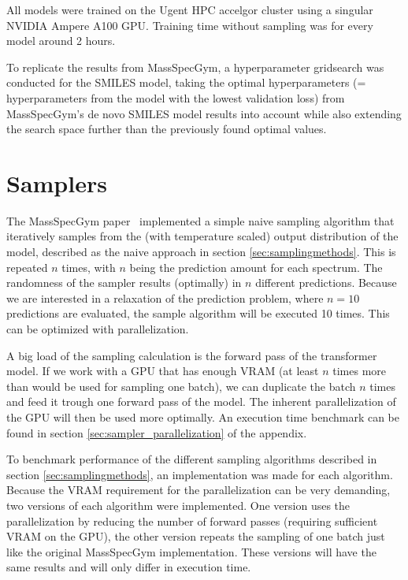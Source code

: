 All models were trained on the Ugent \ac{HPC} accelgor cluster using a singular NVIDIA Ampere A100 GPU.
Training time without sampling was for every model around 2 hours. 

To replicate the results from MassSpecGym, a hyperparameter gridsearch was conducted for the SMILES model, taking the optimal hyperparameters (= hyperparameters from the model with the lowest validation loss) from MassSpecGym's de novo SMILES model results into account
while also extending the search space further than the previously found optimal values.

\section{Samplers}
\label{sec:samplers}

The MassSpecGym paper~\cite{bushuiev2024massspecgym} implemented a simple naive sampling algorithm that iteratively samples from the (with temperature scaled) output distribution of the model, described as the naive approach in section \ref{sec:samplingmethods}.
This is repeated $n$ times, with $n$ being the prediction amount for each spectrum. The randomness of the sampler results (optimally) in $n$ different predictions.
Because we are interested in a relaxation of the prediction problem, where $n=10$ predictions are evaluated, the sample algorithm will be executed 10 times. This can be optimized with parallelization.

A big load of the sampling calculation is the forward pass of the transformer model. 
If we work with a GPU that has enough VRAM (at least $n$ times more than would be used for sampling one batch),
we can duplicate the batch $n$ times and feed it trough one forward pass of the model. The inherent parallelization of the GPU will then be used more optimally.
An execution time benchmark can be found in section \ref{sec:sampler_parallelization} of the appendix.

To benchmark performance of the different sampling algorithms described in section \ref{sec:samplingmethods}, an implementation was made for each algorithm.
Because the VRAM requirement for the parallelization can be very demanding, two versions of each algorithm were implemented. 
One version uses the parallelization by reducing the number of forward passes (requiring sufficient VRAM on the GPU), the other version repeats the sampling of one batch just like the original MassSpecGym implementation.
These versions will have the same results and will only differ in execution time.

